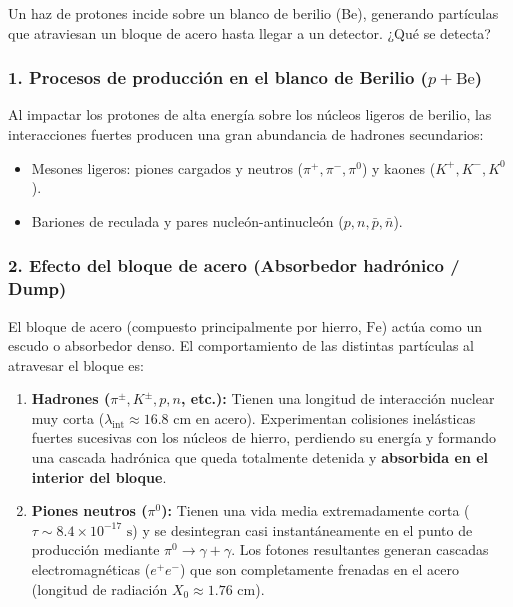 \begin{problema}
Un haz de protones incide sobre un blanco de berilio (Be), generando partículas que atraviesan un bloque de acero hasta llegar a un detector. ¿Qué se detecta?

\tcblower

\subsubsection*{1. Procesos de producción en el blanco de Berilio ($p + \text{Be}$)}

Al impactar los protones de alta energía sobre los núcleos ligeros de berilio, las interacciones fuertes producen una gran abundancia de hadrones secundarios:
\begin{itemize}
    \item Mesones ligeros: piones cargados y neutros ($\pi^+, \pi^-, \pi^0$) y kaones ($K^+, K^-, K^0$).
    \item Bariones de reculada y pares nucleón-antinucleón ($p, n, \bar{p}, \bar{n}$).
\end{itemize}

\subsubsection*{2. Efecto del bloque de acero (Absorbedor hadrónico / Dump)}

El bloque de acero (compuesto principalmente por hierro, $\text{Fe}$) actúa como un escudo o absorbedor denso. El comportamiento de las distintas partículas al atravesar el bloque es:

\begin{enumerate}[label=\arabic*.]
    \item \textbf{Hadrones ($\pi^\pm, K^\pm, p, n$, etc.):} Tienen una longitud de interacción nuclear muy corta ($\lambda_{\text{int}} \approx 16.8\text{ cm}$ en acero). Experimentan colisiones inelásticas fuertes sucesivas con los núcleos de hierro, perdiendo su energía y formando una cascada hadrónica que queda totalmente detenida y \textbf{absorbida en el interior del bloque}.

    \item \textbf{Piones neutros ($\pi^0$):} Tienen una vida media extremadamente corta ($\tau \sim 8.4 \times 10^{-17}\text{ s}$) y se desintegran casi instantáneamente en el punto de producción mediante $\pi^0 \to \gamma + \gamma$. Los fotones resultantes generan cascadas electromagnéticas ($e^+e^-$) que son completamente frenadas en el acero (longitud de radiación $X_0 \approx 1.76\text{ cm}$).


\end{enumerate}
\end{problema}
